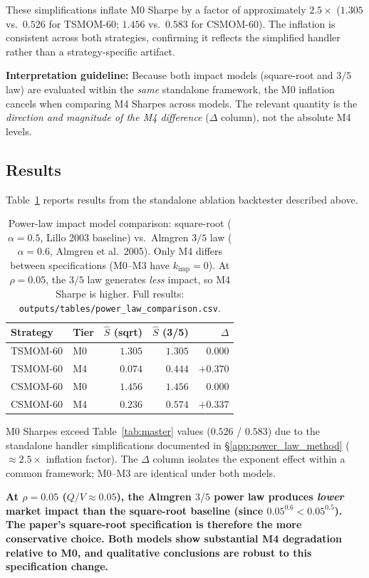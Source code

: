 \documentclass[12pt]{article}
\newcommand{\finding}[1]{\textbf{#1}}
\newcommand{\kimp}{k_{\mathrm{imp}}}
\begin{document}
\noindent These simplifications inflate M0 Sharpe by a factor of
approximately $2.5\times$ ($1.305$ vs.\ $0.526$ for TSMOM-60;
$1.456$ vs.\ $0.583$ for CSMOM-60). The inflation is consistent
across both strategies, confirming it reflects the simplified handler
rather than a strategy-specific artifact.

\textbf{Interpretation guideline:} Because both impact models
(square-root and $3/5$ law) are evaluated within the \emph{same}
standalone framework, the M0 inflation cancels when comparing M4
Sharpes across models. The relevant quantity is the \emph{direction
and magnitude of the M4 difference} ($\Delta$ column), not the
absolute M4 levels.

\subsection{Results}

Table~\ref{tab:power_law} reports results from the standalone ablation
backtester described above.

\begin{table}[H]
\centering
\caption{Power-law impact model comparison: square-root ($\alpha=0.5$,
Lillo 2003 baseline) vs.\ Almgren $3/5$ law ($\alpha=0.6$,
Almgren et al.\ 2005). Only M4 differs between specifications
(M0--M3 have $\kimp=0$). At $\rho = 0.05$, the $3/5$ law generates
\emph{less} impact, so M4 Sharpe is higher.
Full results: \texttt{outputs/tables/power\_law\_comparison.csv}.}
\label{tab:power_law}
\small
\begin{tabular}{llrrr}
\toprule
Strategy & Tier & $\hat{S}$ (sqrt) & $\hat{S}$ (3/5) & $\Delta$ \\
\midrule
TSMOM-60 & M0 & $1.305$ & $1.305$ & $0.000$ \\
TSMOM-60 & M4 & $0.074$ & $0.444$ & $+0.370$ \\
\midrule
CSMOM-60 & M0 & $1.456$ & $1.456$ & $0.000$ \\
CSMOM-60 & M4 & $0.236$ & $0.574$ & $+0.337$ \\
\bottomrule
\end{tabular}
\begin{tablenotes}\small
\item M0 Sharpes exceed Table~\ref{tab:master} values ($0.526$ /
$0.583$) due to the standalone handler simplifications documented in
\S\ref{app:power_law_method} ($\approx 2.5\times$ inflation factor).
The $\Delta$ column isolates the exponent effect within a common
framework; M0--M3 are identical under both models.
\end{tablenotes}
\end{table}

\finding{At $\rho = 0.05$ ($Q/V \approx 0.05$), the Almgren $3/5$
power law produces \emph{lower} market impact than the square-root
baseline (since $0.05^{0.6} < 0.05^{0.5}$). The paper's square-root
specification is therefore the more conservative choice.
Both models show substantial M4 degradation relative to M0, and
qualitative conclusions are robust to this specification change.}
\end{document}
